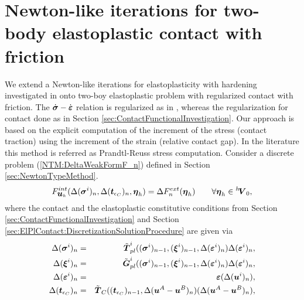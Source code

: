 \documentclass[12pt,a4paper]{scrbook}
\begin{document}
\section{Newton-like iterations for two-body elastoplastic contact with friction}\label{sec:NewtonLikeIteration}
We extend a Newton-like iterations for elastoplasticity with hardening investigated in \cite{AxBlKo97,BlAx97}  onto two-boy elastoplastic problem with regularized  contact  with friction. The $\dot{\mbox{\boldmath$\sigma$}}-\dot{\mbox{\boldmath$\varepsilon$}}$ relation is regularized as in  \cite{KoLa84,AxBlKo97,BlAx97}, whereas the regularization for contact done as in Section \ref{sec:ContactFunctionalInvestigation}. Our approach is based on the explicit computation of the increment of the stress (contact traction) using the increment of the strain (relative contact gap).  In the literature this method is referred as Prandtl-Reuss stress computation. 
Consider  a discrete problem (\ref{NTM:DeltaWeakFormF_n}) defined in Section \ref{sec:NewtonTypeMethod}.
\begin{equation} \label{NLI:DeltaWeakFormF_n}
F^{int}_{\mbox{\boldmath$u$}_h}(\Delta(\mbox{\boldmath$\sigma$}^i)_{n},\Delta(\mbox{\boldmath$t$}_{\epsilon_C})_{n},\mbox{\boldmath$\eta$}_h) = \Delta F^{ext}_{n}(\mbox{\boldmath$\eta$}_h) \qquad \forall \mbox{\boldmath$\eta$}_h \in {}^h\!\mbox{\boldmath$V$}_0,
\end{equation}
where the contact and the elastoplastic constitutive conditions from Section \ref{sec:ContactFunctionalInvestigation} and Section \ref{sec:ElPlContact:DiscretizationSolutionProcedure} are given via
\begin{eqnarray}
\Delta(\mbox{\boldmath$\sigma$}^i)_{n}&=&\tilde{\mbox{\boldmath$T$}}^{i}_{pl}((\mbox{\boldmath$\sigma$}^i)_{n-1},(\mbox{\boldmath$\xi$}^i)_{n-1},\Delta(\mbox{\boldmath$\varepsilon$}^i)_{n})\Delta(\mbox{\boldmath$\varepsilon$}^i)_{n},\label{eq:NLI:StressReturnMappingIncrementFunctional} \\
\Delta(\mbox{\boldmath$\xi$}^i)_{n}&=&\tilde{\mbox{\boldmath$G$}}^{i}_{pl}((\mbox{\boldmath$\sigma$}^i)_{n-1},(\mbox{\boldmath$\xi$}^i)_{n-1},\Delta(\mbox{\boldmath$\varepsilon$}^i)_{n})\Delta(\mbox{\boldmath$\varepsilon$}^i)_{n},\label{eq:NLI:InternalVariableReturnMappingIncrementFunctional} \\
\Delta(\mbox{\boldmath$\varepsilon$}^i)_{n}&=&\mbox{\boldmath$\varepsilon$}(\Delta(\mbox{\boldmath$u$}^i)_{n}),\nonumber \\
\Delta(\mbox{\boldmath$t$}_{\epsilon_C})_{n}&=&\tilde{\mbox{\boldmath$T$}}_{C}((\mbox{\boldmath$t$}_{\epsilon_C})_{n-1},\Delta(\mbox{\boldmath$u$}^{A}-\mbox{\boldmath$u$}^{B})_{n})(\Delta(\mbox{\boldmath$u$}^{A}-\mbox{\boldmath$u$}^{B})_{n}),\label{eq:NLI:ContactReturnMappingIncrementFunctional} 
\end{eqnarray}
\end{document}
